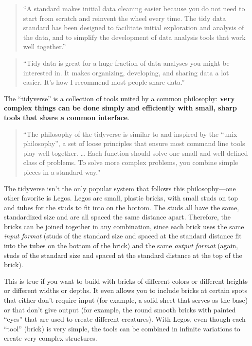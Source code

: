 \documentclass[]{tufte-book}
\begin{document}
\begin{quote}
``A standard makes initial data cleaning easier because you do not need to
start from scratch and reinvent the wheel every time. The tidy data standard has
been designed to facilitate initial exploration and analysis of the data, and to
simplify the development of data analysis tools that work well together.''
\citep{wickham2014tidy}
\end{quote}

\begin{quote}
``Tidy data is great for a huge fraction of data analyses you might
be interested in. It makes organizing, developing, and sharing data a lot
easier. It's how I recommend most people share data.'' \citep{leek2017toward}
\end{quote}

The ``tidyverse'' is a collection of tools united by a common philosophy: \textbf{very
complex things can be done simply and efficiently with small, sharp tools
that share a common interface}.

\begin{quote}
``The philosophy of the tidyverse is similar to
and inspired by the ``unix philosophy'', a set of loose principles that ensure
most command line tools play well together. \ldots{} Each function should solve one
small and well-defined class of problems. To solve more complex problems, you
combine simple pieces in a standard way." \citep{ross2017declutter}
\end{quote}

The tidyverse isn't the only popular system that follows this philosophy---one
other favorite is Legos. Legos are small, plastic bricks, with small studs on
top and tubes for the studs to fit into on the bottom. The studs all have the
same, standardized size and are all spaced the same distance apart. Therefore,
the bricks can be joined together in any combination, since each brick uses the
same \emph{input format} (studs of the standard size and spaced at the standard
distance fit into the tubes on the bottom of the brick) and the same \emph{output
format} (again, studs of the standard size and spaced at the standard distance
at the top of the brick).

This is true if you want to build with bricks of different colors or different
heights or different widths or depths. It even allows you to include bricks at
certain spots that either don't require input (for example, a solid sheet that
serves as the base) or that don't give output (for example, the round smooth
bricks with painted ``eyes'' that are used to create different creatures). With
Legos, even though each ``tool'' (brick) is very simple, the tools can be combined
in infinite variations to create very complex structures.
\end{document}
